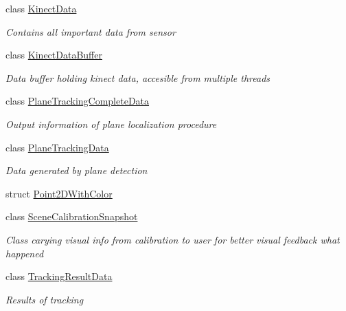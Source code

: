 \begin{DoxyCompactItemize}
class \mbox{\hyperlink{class_chess_tracking_1_1_image_processing_1_1_pipeline_data_1_1_kinect_data}{Kinect\+Data}}
\begin{DoxyCompactList}\small\item\em Contains all important data from sensor \end{DoxyCompactList}\item 
class \mbox{\hyperlink{class_chess_tracking_1_1_image_processing_1_1_pipeline_data_1_1_kinect_data_buffer}{Kinect\+Data\+Buffer}}
\begin{DoxyCompactList}\small\item\em Data buffer holding kinect data, accesible from multiple threads \end{DoxyCompactList}\item 
class \mbox{\hyperlink{class_chess_tracking_1_1_image_processing_1_1_pipeline_data_1_1_plane_tracking_complete_data}{Plane\+Tracking\+Complete\+Data}}
\begin{DoxyCompactList}\small\item\em Output information of plane localization procedure \end{DoxyCompactList}\item 
class \mbox{\hyperlink{class_chess_tracking_1_1_image_processing_1_1_pipeline_data_1_1_plane_tracking_data}{Plane\+Tracking\+Data}}
\begin{DoxyCompactList}\small\item\em Data generated by plane detection \end{DoxyCompactList}\item 
struct \mbox{\hyperlink{struct_chess_tracking_1_1_image_processing_1_1_pipeline_data_1_1_point2_d_with_color}{Point2\+D\+With\+Color}}
\item 
class \mbox{\hyperlink{class_chess_tracking_1_1_image_processing_1_1_pipeline_data_1_1_scene_calibration_snapshot}{Scene\+Calibration\+Snapshot}}
\begin{DoxyCompactList}\small\item\em Class carying visual info from calibration to user for better visual feedback what happened \end{DoxyCompactList}\item 
class \mbox{\hyperlink{class_chess_tracking_1_1_image_processing_1_1_pipeline_data_1_1_tracking_result_data}{Tracking\+Result\+Data}}
\begin{DoxyCompactList}\small\item\em Results of tracking \end{DoxyCompactList}\item 

\end{DoxyCompactItemize}
